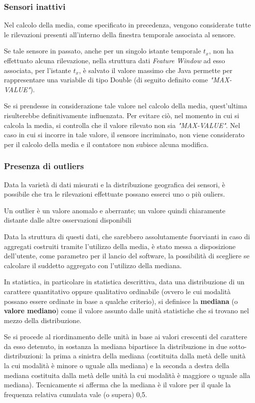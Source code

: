 \documentclass[12pt,a4paper,oneside,openright]{book}
\begin{document}
\subsubsection{Sensori inattivi}
Nel calcolo della media, come specificato in precedenza, vengono considerate tutte le rilevazioni presenti all'interno della finestra temporale associata al sensore. 

Se tale sensore in passato, anche per un singolo istante temporale \textit{$t_{x}$}, non ha effettuato alcuna rilevazione, nella struttura dati \textit{Feature Window} ad esso associata, per l'istante \textit{$t_{x}$}, è salvato il valore massimo che Java permette per rappresentare una variabile di tipo Double (di seguito definito come \textit{"MAX-VALUE"}).


Se si prendesse in considerazione tale valore nel calcolo della media, quest'ultima risulterebbe definitivamente influenzata. Per evitare ciò, nel momento in cui si calcola la media, si controlla che il valore rilevato non sia \textit{"MAX-VALUE"}.
Nel caso in cui si incorre in tale valore, il sensore incriminato, non viene considerato per il calcolo della media e il contatore non subisce alcuna modifica.
 
\subsubsection{Presenza di outliers}
Data la varietà di dati misurati e la distribuzione geografica dei sensori, è possibile che tra le rilevazioni effettuate possano esserci uno o più ouliers. 

Un outlier è un valore anomalo e aberrante; un valore quindi chiaramente distante dalle altre osservazioni disponibili \cite{14a} 

Data la struttura di questi dati, che sarebbero assolutamente fuorvianti in caso di aggregati costruiti tramite l'utilizzo della media, è stato messa a disposizione dell'utente, come parametro per il lancio del software, la possibilità di scegliere se calcolare il suddetto aggregato con l'utilizzo della mediana.

In statistica, in particolare in statistica descrittiva, data una distribuzione di un carattere quantitativo oppure qualitativo ordinabile (ovvero le cui modalità possano essere ordinate in base a qualche criterio), si definisce la \textbf{mediana} (o \textbf{valore mediano}) come il valore assunto dalle unità statistiche che si trovano nel mezzo della distribuzione. 

Se si procede al riordinamento delle unità in base ai valori crescenti del carattere da esso detenuto, in sostanza la mediana bipartisce la distribuzione in due sotto-distribuzioni: la prima a sinistra della mediana (costituita dalla metà delle unità la cui modalità è minore o uguale alla mediana) e la seconda a destra della mediana costituita dalla metà delle unità la cui modalità è maggiore o uguale alla mediana). Tecnicamente si afferma che la mediana è il valore per il quale la frequenza relativa cumulata vale (o supera) 0,5. 
\end{document}
